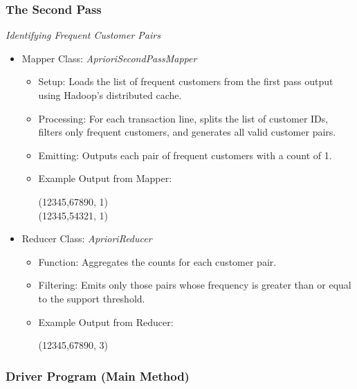 \subsubsection{The Second Pass} \textit{Identifying Frequent Customer Pairs}

\begin{itemize}
    \item Mapper Class: \textit{AprioriSecondPassMapper}
    \begin{itemize}
        \item Setup: Loads the list of frequent customers from the first pass output using Hadoop’s distributed cache.
        \item Processing: For each transaction line, splits the list of customer IDs, filters only frequent customers, and generates all valid customer pairs.
        \item Emitting: Outputs each pair of frequent customers with a count of 1.
        \item Example Output from Mapper:
        \begin{center}
        (12345,67890, 1)\\
        (12345,54321, 1)
        \end{center}
    \end{itemize}

    \item Reducer Class: \textit{AprioriReducer}
    \begin{itemize}
        \item Function: Aggregates the counts for each customer pair.
        \item Filtering: Emits only those pairs whose frequency is greater than or equal to the support threshold.
        \item Example Output from Reducer:
        \begin{center}
        (12345,67890, 3)
        \end{center}
    \end{itemize}
\end{itemize}

\subsubsection{Driver Program (Main Method)}

